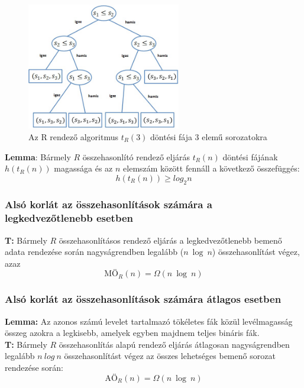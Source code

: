 \documentclass[12pt,margin=0px]{article}
\begin{document}
	\begin{figure}[H]
		\centering
        \includegraphics[width=0.6\textwidth]{img/decisiontree_sample.png}
		\caption{Az R rendező algoritmus $t_{R}(3)$ döntési fája 3 elemű sorozatokra}
        \label{fig:decisiontree_sample}
	\end{figure}
\newpage
    \noindent \textbf{Lemma}: Bármely $R$ összehasonlító rendező eljárás $t_{R}(n)$ döntési fájának $h(t_{R}(n))$ magassága és az $n$ elemszám között fennáll a következő összefüggés:
    \[
        h(t_{R}(n)) \geq log_{2}n
    \]

	\subsubsection*{Alsó korlát az összehasonlítások számára a legkedvezőtlenebb esetben}
	
    \noindent \textbf{T:} Bármely $R$ összehasonlításos rendező eljárás a legkedvezőtlenebb bemenő adata rendezése során nagyságrendben legalább ($n\ \log\ n$) összehasonlítást végez, azaz
    \[
        \text{MÖ}_{R}(n) = \Omega(n\ \log\ n)
    \]

	\subsubsection*{Alsó korlát az összehasonlítások számára átlagos esetben}

    \noindent \textbf{Lemma:} Az azonos számú levelet tartalmazó tökéletes fák közül levélmagasság összeg azokra a legkisebb, amelyek egyben majdnem teljes bináris fák.\\

    \noindent \textbf{T:} Bármely $R$ összehasonlítás alapú rendező eljárás átlagosan nagyságrendben legalább $n\ log\ n$ összehasonlítást végez az összes lehetséges bemenő sorozat rendezése során:
    \[
        \text{AÖ}_{R}(n) = \Omega(n\ \log\ n)
    \]
	
\end{document}
